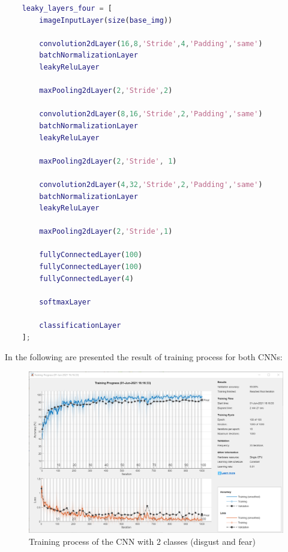 \begin{lstlisting}[language=Matlab] 
	%CNN layers for four-classes classification 
	leaky_layers_four = [
		imageInputLayer(size(base_img))
		
		convolution2dLayer(16,8,'Stride',4,'Padding','same')
		batchNormalizationLayer
		leakyReluLayer
		
		maxPooling2dLayer(2,'Stride',2)
		
		convolution2dLayer(8,16,'Stride',2,'Padding','same')
		batchNormalizationLayer
		leakyReluLayer
		
		maxPooling2dLayer(2,'Stride', 1)
		
		convolution2dLayer(4,32,'Stride',2,'Padding','same')
		batchNormalizationLayer
		leakyReluLayer
		
		maxPooling2dLayer(2,'Stride',1)
		
		fullyConnectedLayer(100)
		fullyConnectedLayer(100)
		fullyConnectedLayer(4)
		
		softmaxLayer
		
		classificationLayer
	];
\end{lstlisting} 

In the following are presented the result of training process for both CNNs:
\begin{figure}[H]
	\centering
	\includegraphics[width=\linewidth]{img/digust_x_fear_training.png}
	\caption{Training process of the CNN with 2 classes (disgust and fear)}
\end{figure}

